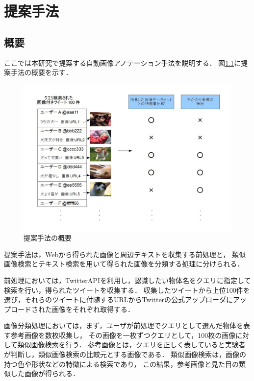 \chapter{提案手法}
\label{sec:way}
\section{概要}
ここでは本研究で提案する自動画像アノテーション手法を説明する．
図\ref{fig:way}に提案手法の概要を示す．
%
\begin{figure}[tb]
 \begin{center}
  \includegraphics[scale=0.50]{way.jpg}
 \end{center}
 \caption{提案手法の概要}
 \label{fig:way}
\end{figure}
%
提案手法は，Webから得られた画像と周辺テキストを収集する前処理と，
類似画像検索とテキスト検索を用いて得られた画像を分類する処理に分けられる．

前処理においては，TwitterAPIを利用し，認識したい物体名をクエリに指定して検索を行い，得られたツイートを収集する．
収集したツイートから上位100件を選び，それらのツイートに付随するURLからTwitterの公式アップローダにアップロードされた画像をそれぞれ取得する．

画像分類処理においては，まず，ユーザが前処理でクエリとして選んだ物体を表す参考画像を数枚収集し，
その画像を一枚ずつクエリとして，100枚の画像に対して類似画像検索を行う．
参考画像とは，クエリを正しく表していると実験者が判断し，類似画像検索の比較元とする画像である．
類似画像検索は，画像の持つ色や形状などの特徴による検索であり，
この結果，参考画像と見た目の類似した画像が得られる．

